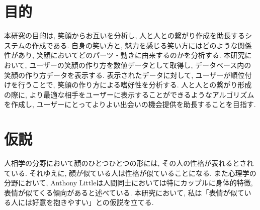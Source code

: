 

\section{目的}
本研究の目的は, 笑顔からお互いを分析し, 人と人との繋がり作成を助長するシステムの作成である.
自身の笑い方と, 魅力を感じる笑い方にはどのような関係性があり, 笑顔においてどのパーツ・動きに由来するのかを分析する.
本研究において, ユーザーの笑顔の作り方を数値データとして取得し,
データベース内の笑顔の作り方データを表示する.
表示されたデータに対して, ユーザーが順位付けを行うことで, 笑顔の作り方による嗜好性を分析する.
人と人との繋がり形成の際に, より最適な相手をユーザーに表示することができるようなアルゴリズムを作成し,
ユーザーにとってよりよい出会いの機会提供を助長することを目指す.


\section{仮説}
人相学の分野において顔のひとつひとつの形には, その人の性格が表れるとされている.
それゆえに, 顔が似ている人は性格が似ていることになる.
また心理学の分野において, Anthony Littleは人間同士においては特にカップルに身体的特徴,
表情が似てくる傾向があると述べている.\cite{AnthonyLittle}
本研究において, 私は「表情が似ている人には好意を抱きやすい」との仮説を立てる.

